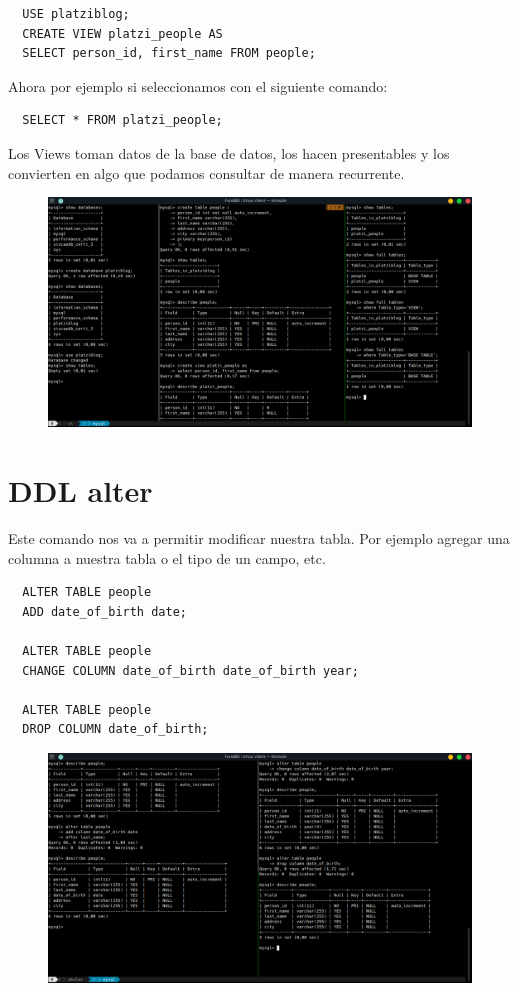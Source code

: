 \documentclass{article}
\begin{document}
\begin{verbatim}
  USE platziblog;
  CREATE VIEW platzi_people AS
  SELECT person_id, first_name FROM people;
\end{verbatim}

Ahora por ejemplo si seleccionamos con el siguiente comando:

\begin{verbatim}
  SELECT * FROM platzi_people;
\end{verbatim}

Los Views toman datos de la base de datos, los hacen presentables y los
convierten en algo que podamos consultar de manera recurrente.

\begin{figure}[h!]
  \centering
  \includegraphics[scale=0.50]{./Pictures/146_ddl_create_vistas.png}
\end{figure}

\section{DDL alter}%
Este comando nos va a permitir modificar nuestra tabla. Por ejemplo agregar una
columna a nuestra tabla o el tipo de un campo, etc.

\begin{verbatim}
  ALTER TABLE people
  ADD date_of_birth date;

  ALTER TABLE people
  CHANGE COLUMN date_of_birth date_of_birth year;

  ALTER TABLE people
  DROP COLUMN date_of_birth;
\end{verbatim}

\begin{figure}[h!]
  \centering
  \includegraphics[scale=0.5]{./Pictures/147_ddl_alter.png}
\end{figure}
\end{document}
